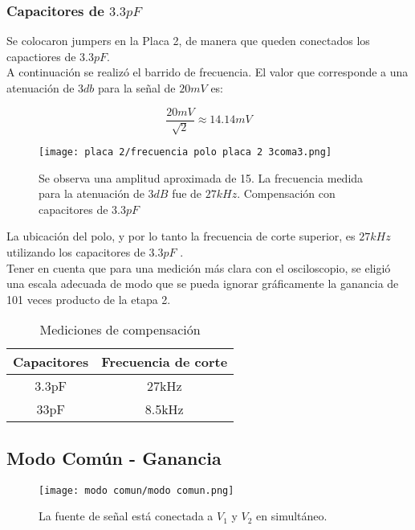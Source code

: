 \documentclass[letterpaper, 10 pt, conference]{ieeeconf}  %
\begin{document}
\subsubsection{Capacitores de $3.3pF$} 
Se colocaron jumpers en la Placa 2, de manera que queden conectados los capactiores de $3.3pF$.\\
A continuación se realizó el barrido de frecuencia. El valor que corresponde a una atenuación de $3db$ para la señal de $20mV$ es:

            \begin{equation}
            \frac{20mV}{\sqrt{2}} \approx 14.14mV 
            \end{equation}

\begin{figure}[H]
  \centering
  \texttt{[image: placa 2/frecuencia polo placa 2 3coma3.png]}
  \caption{Se observa una amplitud aproximada de 15. La frecuencia medida para la atenuación de $3dB$ fue de $27kHz$. Compensación con capacitores de $3.3pF$ }
  \label{fig:fotoplaca2}
\end{figure}

La ubicación del polo, y por lo tanto la frecuencia de corte superior, es $27kHz$ utilizando los capacitores de $3.3pF$ . \\Tener en cuenta que para una medición más clara con el osciloscopio, se eligió una escala adecuada de modo que se pueda ignorar gráficamente la ganancia de 101 veces producto de la etapa 2.


\begin{table}[h]
\begin{center}
\begin{tabular}{|c||c|}
\hline
Capacitores & Frecuencia de corte\\
\hline
3.3pF & 27kHz\\
\hline
33pF & 8.5kHz\\
\hline
\end{tabular}
\end{center}
\caption{Mediciones de compensación}
\label{tab:simple}
\end{table}

\subsection{Modo Común - Ganancia}

\begin{figure}[H]
  \centering
  \texttt{[image: modo comun/modo comun.png]}
  \caption{La fuente de señal está conectada a $V_1$ y $V_2$ en simultáneo. }
  \label{fig:fotoplaca2}
\end{figure}
\end{document}
